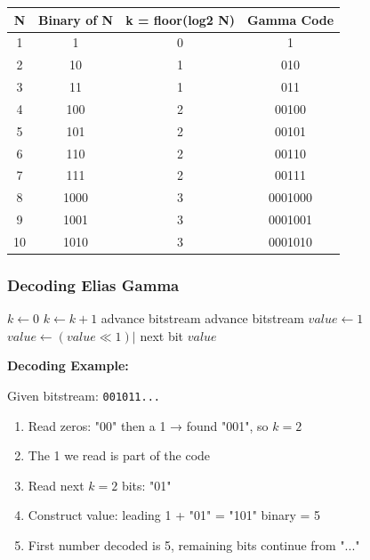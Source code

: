 \begin{tabular}{|c|c|c|c|}
\hline
\textbf{N} & \textbf{Binary of N} & \textbf{k = floor(log2 N)} & \textbf{Gamma Code} \\
\hline
1  & 1    & 0 & 1 \\
2  & 10   & 1 & 010 \\
3  & 11   & 1 & 011 \\
4  & 100  & 2 & 00100 \\
5  & 101  & 2 & 00101 \\
6  & 110  & 2 & 00110 \\
7  & 111  & 2 & 00111 \\
8  & 1000 & 3 & 0001000 \\
9  & 1001 & 3 & 0001001 \\
10 & 1010 & 3 & 0001010 \\
\hline
\end{tabular}

\subsubsection*{Decoding Elias Gamma}

\begin{algorithm}[H]
\caption{Elias Gamma Decoding}
\begin{algorithmic}[1]
    \State $k \gets 0$
     
        \State $k \gets k + 1$
        \State advance bitstream
    \EndWhile
    \State advance bitstream 
    \State $value \gets 1$ 
        \State $value \gets (value \ll 1) |$ next bit
    \EndFor
    \State \Return $value$
\EndProcedure
\end{algorithmic}
\end{algorithm}

\begin{examplebox}
\textbf{Decoding Example:}

Given bitstream: \texttt{001011...}

\begin{enumerate}
    \item Read zeros: "00" then a 1 → found "001", so $k = 2$
    \item The 1 we read is part of the code
    \item Read next $k=2$ bits: "01"
    \item Construct value: leading 1 + "01" = "101" binary = 5
    \item First number decoded is 5, remaining bits continue from "..."
\end{enumerate}
\end{examplebox}

